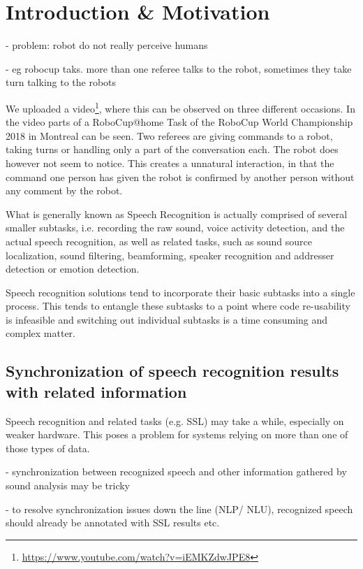 
\chapter{Introduction \& Motivation}

- problem: robot do not really perceive humans

- eg robocup taks. more than one referee talks to the robot, sometimes they take turn talking to the robots

We uploaded a video\footnote{\url{https://www.youtube.com/watch?v=iEMKZdwJPE8}}, where this can be observed on three different occasions.
In the video parts of a RoboCup@home Task of the RoboCup World Championship 2018 in Montreal can be seen.
Two referees are giving commands to a robot, taking turns or handling only a part of the conversation each.
The robot does however not seem to notice.
This creates a unnatural interaction, in that the command one person has given the robot is confirmed by another person without any comment by the robot.


What is generally known as Speech Recognition is actually comprised of several smaller subtasks, i.e. recording the raw sound, voice activity detection, and the actual speech recognition, as well as related tasks, such as sound source localization, sound filtering, beamforming, speaker recognition and addresser detection or emotion detection. %

Speech recognition solutions tend to incorporate their basic subtasks into a single process.
This tends to entangle these subtasks to a point where code re-usability is infeasible and switching out individual subtasks is a time consuming and complex matter.

\section{Synchronization of speech recognition results with related information}

Speech recognition and related tasks (e.g. SSL) may take a while, especially on weaker hardware. 
This poses a problem for systems relying on more than one of those types of data. 

- synchronization between recognized speech and other information gathered by sound analysis may be tricky

- to resolve synchronization issues down the line (NLP/ NLU), recognized speech should already be annotated with SSL results etc.

